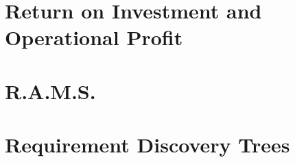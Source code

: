 \documentclass[11pt]{report}
\begin{document}
%
%

\chapter{Return on Investment and Operational Profit}
\label{blInvestment}

%
%

\chapter{R.A.M.S.}
\label{blRAMS1}


%
%




%
%

\appendix
\chapter{Requirement Discovery Trees}
\label{reqdisctree}
\end{document}
